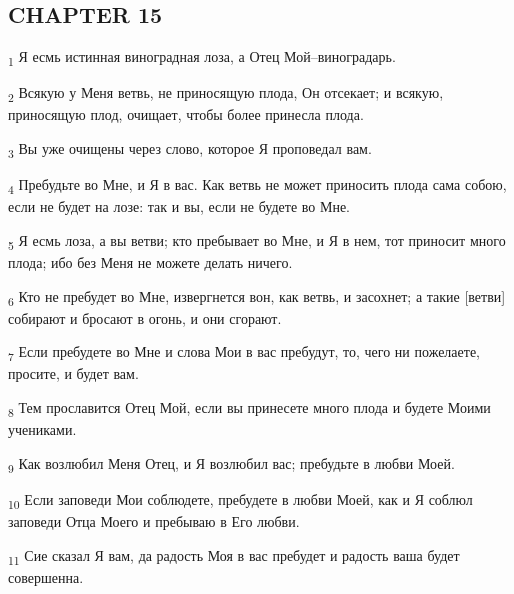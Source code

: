 \subsection{CHAPTER 15}
\begin{tcolorbox}
\textsubscript{1} Я есмь истинная виноградная лоза, а Отец Мой--виноградарь.
\end{tcolorbox}
\begin{tcolorbox}
\textsubscript{2} Всякую у Меня ветвь, не приносящую плода, Он отсекает; и всякую, приносящую плод, очищает, чтобы более принесла плода.
\end{tcolorbox}
\begin{tcolorbox}
\textsubscript{3} Вы уже очищены через слово, которое Я проповедал вам.
\end{tcolorbox}
\begin{tcolorbox}
\textsubscript{4} Пребудьте во Мне, и Я в вас. Как ветвь не может приносить плода сама собою, если не будет на лозе: так и вы, если не будете во Мне.
\end{tcolorbox}
\begin{tcolorbox}
\textsubscript{5} Я есмь лоза, а вы ветви; кто пребывает во Мне, и Я в нем, тот приносит много плода; ибо без Меня не можете делать ничего.
\end{tcolorbox}
\begin{tcolorbox}
\textsubscript{6} Кто не пребудет во Мне, извергнется вон, как ветвь, и засохнет; а такие [ветви] собирают и бросают в огонь, и они сгорают.
\end{tcolorbox}
\begin{tcolorbox}
\textsubscript{7} Если пребудете во Мне и слова Мои в вас пребудут, то, чего ни пожелаете, просите, и будет вам.
\end{tcolorbox}
\begin{tcolorbox}
\textsubscript{8} Тем прославится Отец Мой, если вы принесете много плода и будете Моими учениками.
\end{tcolorbox}
\begin{tcolorbox}
\textsubscript{9} Как возлюбил Меня Отец, и Я возлюбил вас; пребудьте в любви Моей.
\end{tcolorbox}
\begin{tcolorbox}
\textsubscript{10} Если заповеди Мои соблюдете, пребудете в любви Моей, как и Я соблюл заповеди Отца Моего и пребываю в Его любви.
\end{tcolorbox}
\begin{tcolorbox}
\textsubscript{11} Сие сказал Я вам, да радость Моя в вас пребудет и радость ваша будет совершенна.
\end{tcolorbox}
